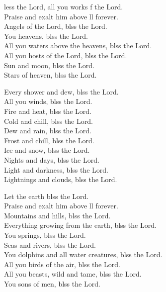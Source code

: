 \settowidth{\versewidth}{Let us bless the Father, and the Son, and the Holy Spirit. *}
\begin{psalmverse}%
  \begin{patverse}
    less the Lord, all you works f the Lord.\Med\\
Praise and exalt him above ll forever.\\
Angels of the Lord, blss the Lord.\Med\\
You heavens, blss the Lord.\\
All you waters above the heavens, blss the Lord.\Med\\
All you hosts of the Lord, blss the Lord.\\
Sun and moon, blss the Lord.\Med\\
Stars of heaven, blss the Lord.

Every shower and dew, blss the Lord.\Med\\
All you winds, blss the Lord.\\
Fire and heat, blss the Lord.\Med\\
Cold and chill, blss the Lord.\\
Dew and rain, blss the Lord.\Med\\
Frost and chill, blss the Lord.\\
Ice and snow, blss the Lord.\Med\\
Nights and days, blss the Lord.\\
Light and darkness, blss the Lord.\Med\\
Lightnings and clouds, blss the Lord.

Let the earth blss the Lord.\Med\\
Praise and exalt him above ll forever.\\
Mountains and hills, blss the Lord.\Med\\
Everything growing from the earth, blss the Lord.\\
You springs, blss the Lord.\Med\\
Seas and rivers, blss the Lord.\\
You dolphins and all water creatures, blss the Lord.\Med\\
All you birds of the air, blss the Lord.\\
All you beasts, wild and tame, blss the Lord.\Med\\
You sons of men, blss the Lord.


\end{patverse}
\end{psalmverse}
